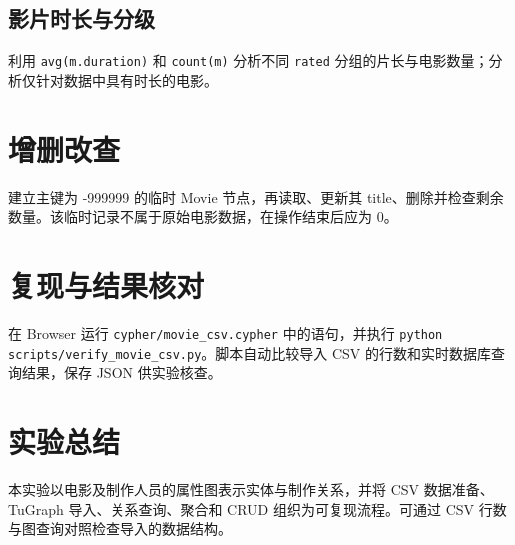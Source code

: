 \documentclass[UTF8,a4paper,zihao=-4,fontset=windows]{ctexart}
\begin{document}
\subsection{影片时长与分级}
利用 \texttt{avg(m.duration)} 和 \texttt{count(m)} 分析不同 \texttt{rated} 分组的片长与电影数量；分析仅针对数据中具有时长的电影。
\section{增删改查}
建立主键为 -999999 的临时 Movie 节点，再读取、更新其 title、删除并检查剩余数量。该临时记录不属于原始电影数据，在操作结束后应为 0。
\section{复现与结果核对}
在 Browser 运行 \texttt{cypher/movie\_csv.cypher} 中的语句，并执行 \texttt{python scripts/verify\_movie\_csv.py}。脚本自动比较导入 CSV 的行数和实时数据库查询结果，保存 JSON 供实验核查。
\section{实验总结}
本实验以电影及制作人员的属性图表示实体与制作关系，并将 CSV 数据准备、TuGraph 导入、关系查询、聚合和 CRUD 组织为可复现流程。可通过 CSV 行数与图查询对照检查导入的数据结构。
\end{document}
